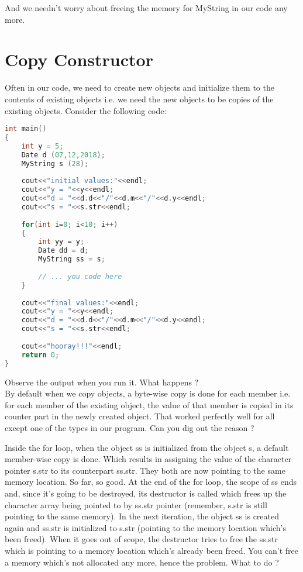 \documentclass[11pt,fleqn]{book} %
\begin{document}
And we needn't worry about freeing the memory for MyString in our code any more.

\section{Copy Constructor}
Often in our code, we need to create new objects and initialize them to the contents of existing objects i.e. we need the new objects to be copies of the existing objects. Consider the following code:
\begin{lstlisting}[language=C++, caption = Need for Copy Ctor]
int main() 
{
	int y = 5;
	Date d (07,12,2018);
	MyString s (28);
	
	cout<<"initial values:"<<endl;
	cout<<"y = "<<y<<endl;
	cout<<"d = "<<d.d<<"/"<<d.m<<"/"<<d.y<<endl;
	cout<<"s = "<<s.str<<endl;
	
	for(int i=0; i<10; i++)
	{	
		int yy = y;
		Date dd = d;
		MyString ss = s;
		
		// ... you code here
	}
	
	cout<<"final values:"<<endl;
	cout<<"y = "<<y<<endl;
	cout<<"d = "<<d.d<<"/"<<d.m<<"/"<<d.y<<endl;
	cout<<"s = "<<s.str<<endl;
	
	cout<<"hooray!!!"<<endl;
	return 0;
}
\end{lstlisting}

\noindent Observe the output when you run it. What happens ?
\smallskip
~\\

\noindent By default when we copy objects, a byte-wise copy is done for each member i.e. for each member of the existing object, the value of that member is copied in its counter part in the newly created object. That worked perfectly well for all except one of the types in our program. Can you dig out the reason ?

Inside the for loop, when the object ss is initialized from the object s, a default member-wise copy is done. Which results in assigning the value of the character pointer s.str to its counterpart ss.str. They both are now pointing to the same memory location. So far, so good. At the end of the for loop, the scope of ss ends and, since it's going to be destroyed, its destructor is called which frees up the character array being pointed to by ss.str pointer (remember, s.str is still pointing to the same memory). In the next iteration, the object ss is created again and ss.str is initialized to s.str (pointing to the memory location which's been freed). When it goes out of scope, the destructor tries to free the ss.str which is pointing to a memory location which's already been freed. You can't free a memory which's not allocated any more, hence the problem. What to do ?
\end{document}
